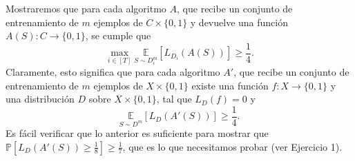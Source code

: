 \begin{teo}
Mostraremos que para cada algoritmo $A$, que recibe un conjunto de entrenamiento de $m$ ejemplos de $C \times \{0, 1\}$ y devuelve una función $A(S) : C \rightarrow \{0, 1\}$, se cumple que
\begin{equation}
    \max_{i \in [T]} \underset{S \sim D_i^m}{\mathbb{E}}[L_{D_i}(A(S))] \geq \frac{1}{4}. 
\end{equation}
Claramente, esto significa que para cada algoritmo $A'$, que recibe un conjunto de entrenamiento de $m$ ejemplos de $X \times \{0, 1\}$ existe una función $f : X \rightarrow \{0, 1\}$ y una distribución $D$ sobre $X \times \{0, 1\}$, tal que $L_D(f) = 0$ y
\begin{equation}
    \underset{S \sim D^m}{\mathbb{E}}[L_D(A'(S))] \geq \frac{1}{4}. 
\end{equation}
Es fácil verificar que lo anterior es suficiente para mostrar que $\mathbb{P}[L_D(A'(S)) \geq \frac{1}{8}] \geq \frac{1}{7}$, que es lo que necesitamos probar (ver Ejercicio 1).


\end{teo}
